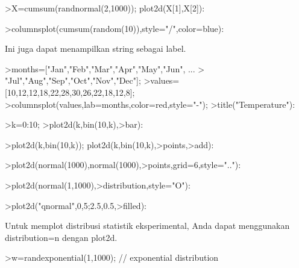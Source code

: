 \documentclass[a4paper,10pt]{article}
\begin{document}
\begin{eulernotebook}
\begin{eulercomment}
\begin{eulercomment}
\begin{eulercomment}
\begin{eulercomment}
\begin{eulercomment}
\begin{eulercomment}
\begin{eulercomment}
\end{eulercomment}
\begin{eulerprompt}
>X=cumsum(randnormal(2,1000)); plot2d(X[1],X[2]):
\end{eulerprompt}
\begin{eulerprompt}
>columnsplot(cumsum(random(10)),style="/",color=blue):
\end{eulerprompt}
\begin{eulercomment}
Ini juga dapat menampilkan string sebagai label.
\end{eulercomment}
\begin{eulerprompt}
>months=["Jan","Feb","Mar","Apr","May","Jun", ...
>  "Jul","Aug","Sep","Oct","Nov","Dec"];
>values=[10,12,12,18,22,28,30,26,22,18,12,8];
>columnsplot(values,lab=months,color=red,style="-");
>title("Temperature"):
\end{eulerprompt}
\begin{eulerprompt}
>k=0:10;
>plot2d(k,bin(10,k),>bar):
\end{eulerprompt}
\begin{eulerprompt}
>plot2d(k,bin(10,k)); plot2d(k,bin(10,k),>points,>add):
\end{eulerprompt}
\begin{eulerprompt}
>plot2d(normal(1000),normal(1000),>points,grid=6,style=".."):
\end{eulerprompt}
\begin{eulerprompt}
>plot2d(normal(1,1000),>distribution,style="O"):
\end{eulerprompt}
\begin{eulerprompt}
>plot2d("qnormal",0,5;2.5,0.5,>filled):
\end{eulerprompt}
\begin{eulercomment}
Untuk memplot distribusi statistik eksperimental, Anda dapat
menggunakan distribution=n dengan plot2d.
\end{eulercomment}
\begin{eulerprompt}
>w=randexponential(1,1000); // exponential distribution

\end{eulerprompt}
\end{eulercomment}
\end{eulercomment}
\end{eulercomment}
\end{eulercomment}
\end{eulercomment}
\end{eulercomment}
\end{eulernotebook}
\end{document}
